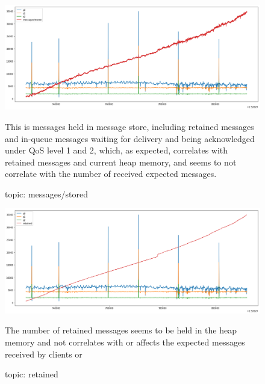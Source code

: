 \documentclass[12pt, letterpaper]{article}
\begin{document}
\begin{figure}
	\setlength{\tabcolsep}{0pt}
	\caption{topic: messages/stored}
	\label{f:valid_cnt_messages_stored}
	\begin{center}
		\includegraphics[width=\textwidth]{valid_cnt/valid_cnt-messages_stored}	
	\end{center}
	This is messages held in message store, including retained messages and in-queue messages waiting for delivery and being acknowledged under QoS level 1 and 2, which, as expected, correlates with retained messages and current heap memory, and seems to not correlate with the number of received expected messages.
\end{figure}
\begin{figure}
	\setlength{\tabcolsep}{0pt}
	\caption{topic: retained}
	\label{f:valid_cnt_retained}
	\begin{center}
		\includegraphics[width=\textwidth]{valid_cnt/valid_cnt-retained}	
	\end{center}
	The number of retained messages seems to be held in the heap memory and not correlates with or affects the expected messages received by clients or 
\end{figure}
\end{document}
